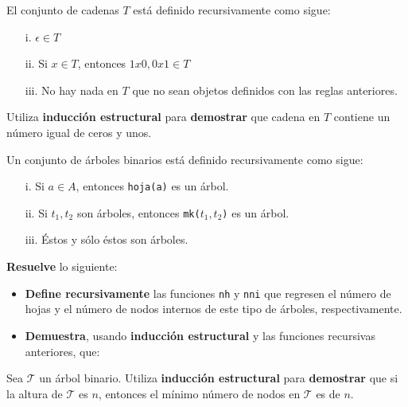 \documentclass[oneside]{style}
\begin{document}
\begin{questions}[label=\protect\circled{\bfseries\arabic*}]
    \question
    {
        El conjunto de cadenas $T$ está definido recursivamente como sigue:
        \begin{itemize}
            \item [i.] $\epsilon \in T$
            \item [ii.] Si $x \in T$, entonces $1x0, 0x1 \in T$
            \item [iii.] No hay nada en $T$ que no sean objetos definidos con 
            las reglas anteriores.  
        \end{itemize}

        Utiliza \textbf{inducción estructural} para \textbf{demostrar} que
        cadena en $T$ contiene un número igual de ceros y unos. 
    }

    \question
    {
        Un conjunto de árboles binarios está definido recursivamente 
        como sigue:
        \begin{itemize}
            \item [i.] Si $a \in A$, entonces \texttt{hoja(a)} es un árbol.
            \item [ii.] Si $t_1, t_2$ son árboles, entonces \texttt{mk($t_1,t_2$)} 
            es un árbol. 
            \item [iii.] Éstos y sólo éstos son árboles. 
        \end{itemize}

        \textbf{Resuelve} lo siguiente: 

        \begin{itemize}
            \item \textbf{Define recursivamente} las funciones \texttt{nh} y 
            \texttt{nni} que regresen el número de hojas y el número de nodos 
            internos de este tipo de árboles, respectivamente.   

            \item \textbf{Demuestra}, usando \textbf{inducción estructural} y 
            las funciones recursivas anteriores, que:   
            \begin{center}
            \end{center}
        \end{itemize}
    }

    \question
    {
        Sea $\mathcal{T}$ un árbol binario. Utiliza \textbf{inducción 
        estructural} para \textbf{demostrar} que si la altura de $\mathcal{T}$ 
        es $n$, entonces el mínimo número de nodos en $\mathcal{T}$ es de $n$. 
    }


\end{questions}
\end{document}
